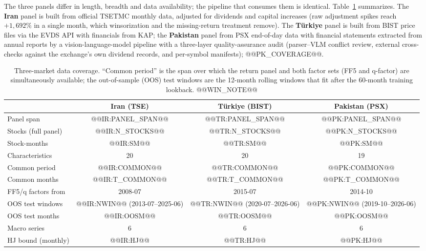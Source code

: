 \documentclass[12pt]{article}
\begin{document}
The three panels differ in length, breadth and data availability; the pipeline that consumes them is identical. Table~\ref{tab:coverage} summarizes. The \textbf{Iran} panel is built from official TSETMC monthly data, adjusted for dividends and capital increases (raw adjustment spikes reach $+1{,}692\%$ in a single month, which winsorization and the missing-return treatment remove). The \textbf{T\"urkiye} panel is built from BIST price files via the EVDS API with financials from KAP; the \textbf{Pakistan} panel from PSX end-of-day data with financial statements extracted from annual reports by a vision-language-model pipeline with a three-layer quality-assurance audit (parser--VLM conflict review, external cross-checks against the exchange's own dividend records, and per-symbol manifests); @@PK_COVERAGE@@.

\begin{table}[htbp]
\centering
\caption{Three-market data coverage. ``Common period'' is the span over which the return panel and both factor sets (FF5 and q-factor) are simultaneously available; the out-of-sample (OOS) test windows are the 12-month rolling windows that fit after the 60-month training lookback. @@WIN_NOTE@@}
\label{tab:coverage}
\small
\setlength{\tabcolsep}{4pt}
\begin{tabular}{lccc}
\toprule
 & Iran (TSE) & T\"urkiye (BIST) & Pakistan (PSX) \\
\midrule
Panel span & @@IR:PANEL_SPAN@@ & @@TR:PANEL_SPAN@@ & @@PK:PANEL_SPAN@@ \\
Stocks (full panel) & @@IR:N_STOCKS@@ & @@TR:N_STOCKS@@ & @@PK:N_STOCKS@@ \\
Stock-months & @@IR:SM@@ & @@TR:SM@@ & @@PK:SM@@ \\
Characteristics & 20 & 20 & 19 \\
Common period & @@IR:COMMON@@ & @@TR:COMMON@@ & @@PK:COMMON@@ \\
Common months & @@IR:T_COMMON@@ & @@TR:T_COMMON@@ & @@PK:T_COMMON@@ \\
FF5/q factors from & 2008-07 & 2015-07 & 2014-10 \\
OOS test windows & @@IR:NWIN@@ (2013-07--2025-06) & @@TR:NWIN@@ (2020-07--2026-06) & @@PK:NWIN@@ (2019-10--2026-06) \\
OOS test months & @@IR:OOSM@@ & @@TR:OOSM@@ & @@PK:OOSM@@ \\
Macro series & 6 & 6 & 6 \\
HJ bound (monthly) & @@IR:HJ@@ & @@TR:HJ@@ & @@PK:HJ@@ \\
\bottomrule
\end{tabular}
\end{table}
\end{document}

